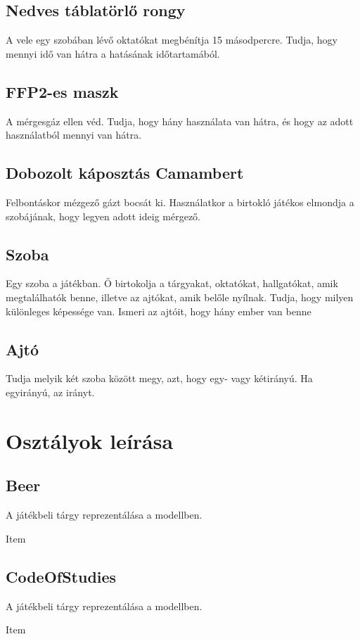 \subsection{Nedves táblatörlő rongy}
A vele egy szobában lévő oktatókat megbénítja 15 másodpercre.
Tudja, hogy  mennyi idő van hátra a hatásának időtartamából.

\subsection{FFP2-es maszk}
A mérgesgáz ellen véd. Tudja, hogy hány használata van hátra, és hogy az adott használatból mennyi van hátra.

\subsection{Dobozolt káposztás Camambert}
Felbontáskor mézgező gázt bocsát ki. Használatkor a birtokló játékos elmondja a szobájának, hogy legyen adott ideig mérgező.

\subsection{Szoba}
Egy szoba a játékban. Ő birtokolja a tárgyakat, oktatókat, hallgatókat, amik megtalálhatók benne, illetve az ajtókat, amik belőle nyílnak. Tudja, hogy milyen különleges képessége van. Ismeri az ajtóit, hogy hány ember van benne

\subsection{Ajtó}
Tudja melyik két szoba között megy, azt, hogy egy- vagy kétirányú. Ha egyirányú, az irányt.

\section{Osztályok leírása}
\subsection{Beer}
\begin{class-template-responsibility}
A játékbeli tárgy reprezentálása a modellben.
\end{class-template-responsibility}
\begin{class-template-interface}
    Item
\end{class-template-interface}

\subsection{CodeOfStudies}
\begin{class-template-responsibility}
A játékbeli tárgy reprezentálása a modellben.
\end{class-template-responsibility}
\begin{class-template-interface}
    Item
\end{class-template-interface}
\begin{class-template-attribute}
\end{class-template-attribute}

